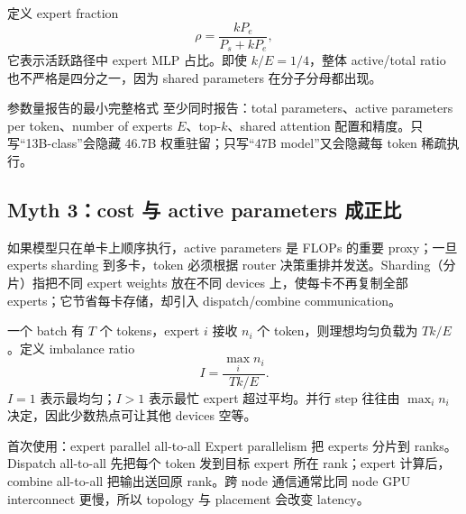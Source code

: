 
定义 expert fraction
\[
\rho=\frac{kP_e}{P_s+kP_e},
\]
它表示活跃路径中 expert MLP 占比。即使 $k/E=1/4$，整体 active/total ratio 也不严格是四分之一，因为 shared parameters 在分子分母都出现。

\begin{importantbox}{参数量报告的最小完整格式}
至少同时报告：total parameters、active parameters per token、number of experts $E$、top-$k$、shared attention 配置和精度。只写“13B-class”会隐藏 46.7B 权重驻留；只写“47B model”又会隐藏每 token 稀疏执行。
\end{importantbox}


\subsection{Myth 3：cost 与 active parameters 成正比}

如果模型只在单卡上顺序执行，active parameters 是 FLOPs 的重要 proxy；一旦 experts sharding 到多卡，token 必须根据 router 决策重排并发送。Sharding（分片）指把不同 expert weights 放在不同 devices 上，使每卡不再复制全部 experts；它节省每卡存储，却引入 dispatch/combine communication。


一个 batch 有 $T$ 个 tokens，expert $i$ 接收 $n_i$ 个 token，则理想均匀负载为 $T k/E$。定义 imbalance ratio
\[
I=\frac{\max_i n_i}{Tk/E}.
\]
$I=1$ 表示最均匀；$I>1$ 表示最忙 expert 超过平均。并行 step 往往由 $\max_i n_i$ 决定，因此少数热点可让其他 devices 空等。

\begin{knowledgebox}{首次使用：expert parallel all-to-all}
Expert parallelism 把 experts 分片到 ranks。Dispatch all-to-all 先把每个 token 发到目标 expert 所在 rank；expert 计算后，combine all-to-all 把输出送回原 rank。跨 node 通信通常比同 node GPU interconnect 更慢，所以 topology 与 placement 会改变 latency。
\end{knowledgebox}


